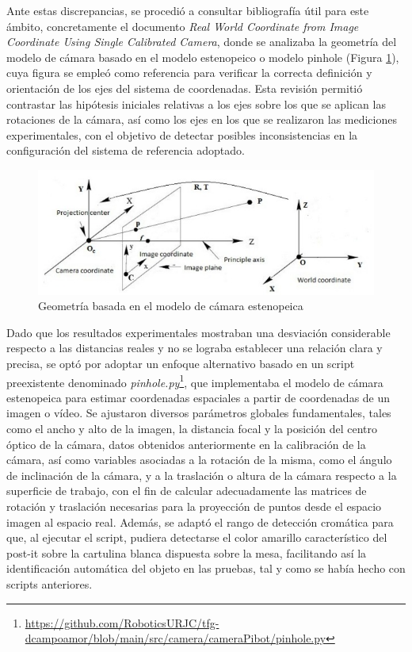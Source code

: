 Ante estas discrepancias, se procedió a consultar bibliografía útil para este ámbito, concretamente el documento \textit{Real World Coordinate from Image Coordinate Using Single Calibrated Camera}\cite{Joko13}, donde se analizaba la geometría del modelo de cámara basado en el modelo estenopeico o modelo pinhole (Figura \ref{fig:geometria_modelopinhole}), cuya figura se empleó como referencia para verificar la correcta definición y orientación de los ejes del sistema de coordenadas. Esta revisión permitió contrastar las hipótesis iniciales relativas a los ejes sobre los que se aplican las rotaciones de la cámara, así como los ejes en los que se realizaron las mediciones experimentales, con el objetivo de detectar posibles inconsistencias en la configuración del sistema de referencia adoptado.

  \begin{figure}[H]
     \centering
     \begin{center}
       \includegraphics[width=135mm]{figs/Geometría del modelo de cámara basado en el modelo de cámara estenopeica.jpeg}
     \end{center}
     \caption{Geometría basada en el modelo de cámara estenopeica}
    \label{fig:geometria_modelopinhole}
  \end{figure}

Dado que los resultados experimentales mostraban una desviación considerable respecto a las distancias reales y no se lograba establecer una relación clara y precisa, se optó por adoptar un enfoque alternativo basado en un script preexistente denominado \textit{pinhole.py}\footnote{\url{https://github.com/RoboticsURJC/tfg-dcampoamor/blob/main/src/camera/cameraPibot/pinhole.py}}, que implementaba el modelo de cámara estenopeica para estimar coordenadas espaciales a partir de coordenadas de un imagen o vídeo. Se ajustaron diversos parámetros globales fundamentales, tales como el ancho y alto de la imagen, la distancia focal y la posición del centro óptico de la cámara, datos obtenidos anteriormente en la calibración de la cámara, así como variables asociadas a la rotación de la misma, como el ángulo de inclinación de la cámara, y a la traslación o altura de la cámara respecto a la superficie de trabajo, con el fin de calcular adecuadamente las matrices de rotación y traslación necesarias para la proyección de puntos desde el espacio imagen al espacio real. Además, se adaptó el rango de detección cromática para que, al ejecutar el script, pudiera detectarse el color amarillo característico del post-it sobre la cartulina blanca dispuesta sobre la mesa, facilitando así la identificación automática del objeto en las pruebas, tal y como se había hecho con scripts anteriores.\\

